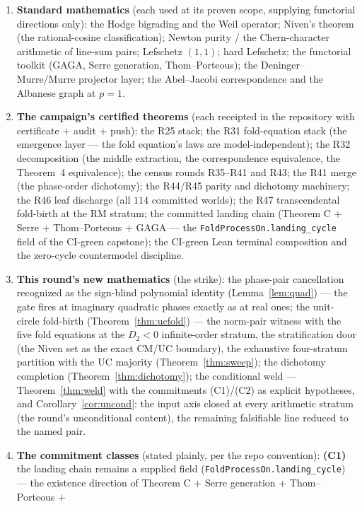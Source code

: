 \documentclass[11pt]{article}
\begin{document}
\begin{enumerate}[label=(\alph*)]
\item \textbf{Standard mathematics} (each used at its proven scope,
 supplying functorial directions only): the Hodge bigrading and the
 Weil operator; Niven's theorem (the
rational-cosine classification); Newton purity / the Chern-character
arithmetic of line-sum pairs; Lefschetz $(1,1)$; hard Lefschetz;
the functorial toolkit (GAGA, Serre generation, Thom--Porteous); the
Deninger--Murre/Murre
projector layer; the Abel--Jacobi correspondence and the Albanese
graph at $p=1$.
\item \textbf{The campaign's certified theorems} (each receipted in
the repository with certificate $+$ audit $+$ push): the R25 stack;
the R31 fold-equation stack (the emergence layer --- the fold
equation's laws are model-independent); the R32 decomposition (the
middle extraction, the correspondence equivalence, the Theorem~4
equivalence); the census rounds R35--R41 and R43; the R41 merge (the phase-order
dichotomy); the R44/R45 parity and dichotomy machinery; the R46 leaf
discharge (all $114$ committed worlds); the R47 transcendental
fold-birth at the RM stratum; the committed landing chain
(Theorem C $+$ Serre $+$ Thom--Porteous $+$ GAGA --- the
\texttt{FoldProcessOn.landing\_cycle} field of the CI-green
capstone); the CI-green Lean terminal composition and the zero-cycle
countermodel discipline.
\item \textbf{This round's new mathematics} (the strike): the
phase-pair cancellation recognized as the sign-blind polynomial
identity (Lemma~\ref{lem:quad}) --- the gate fires at imaginary
quadratic phases exactly as at real ones; the unit-circle fold-birth
(Theorem~\ref{thm:ucfold}) --- the norm-pair witness with the five
fold equations at the $D_2<0$ infinite-order stratum, the
stratification door (the Niven set as the exact CM/UC boundary),
the exhaustive four-stratum partition with the UC majority
(Theorem~\ref{thm:sweep}); the dichotomy completion
(Theorem~\ref{thm:dichotomy}); the conditional weld ---
Theorem~\ref{thm:weld} with the commitments (C1)/(C2) as explicit
hypotheses, and Corollary~\ref{cor:uncond}: the input axis closed at
every arithmetic stratum (the round's unconditional content), the
remaining falsifiable line reduced to the named pair.
\item \textbf{The commitment classes} (stated plainly, per the repo
convention): \textbf{(C1)} the landing chain remains a supplied
field (\texttt{FoldProcessOn.landing\_cycle}) --- the existence
direction of Theorem C $+$ Serre generation $+$ Thom--Porteous $+$

\end{enumerate}
\end{document}
